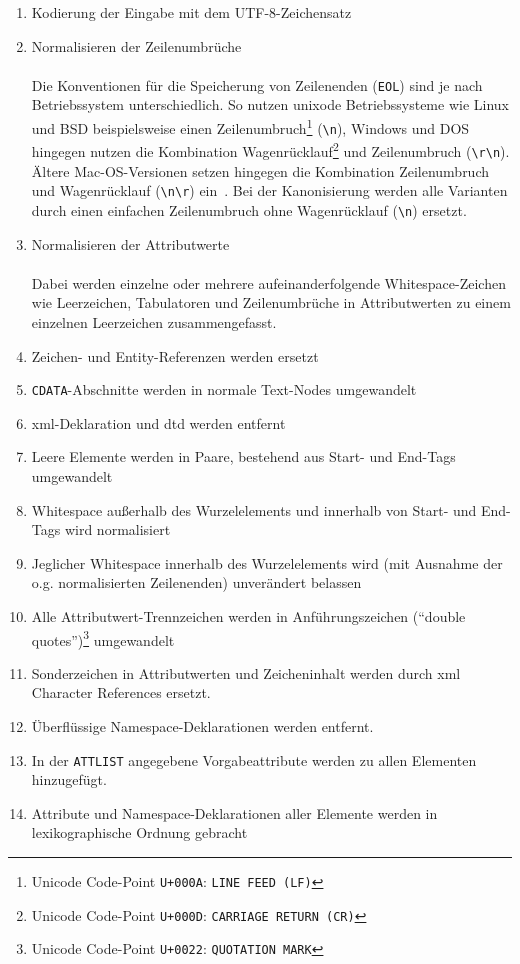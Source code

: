 \begin{enumerate}
    \item{} {Kodierung der Eingabe mit dem UTF-8-Zeichensatz}
    \item{} {Normalisieren der Zeilenumbrüche}\\\\
        Die Konventionen für die Speicherung von Zeilenenden (\texttt{EOL})
        sind je nach Betriebssystem unterschiedlich. So nutzen unixode
        Betriebssysteme wie Linux und BSD beispielsweise einen
        Zeilenumbruch\footnote{Unicode Code-Point \texttt{U+000A}:
        \texttt{LINE FEED (LF)}} (\texttt{{\textbackslash}n}), Windows und DOS hingegen
        nutzen die Kombination Wagenrücklauf\footnote{Unicode Code-Point
        \texttt{U+000D}: \texttt{CARRIAGE RETURN (CR)}} und Zeilenumbruch
        (\texttt{{\textbackslash}r{\textbackslash}n}). Ältere Mac-OS-Versionen setzen hingegen die
        Kombination Zeilenumbruch und Wagenrücklauf (\texttt{{\textbackslash}n{\textbackslash}r})
        ein~\cite[S.~212]{unicode9}.
        Bei der Kanonisierung werden alle Varianten durch einen einfachen
        Zeilenumbruch ohne Wagenrücklauf (\texttt{{\textbackslash}n}) ersetzt.
    \item{} {Normalisieren der Attributwerte}\\\\
        Dabei werden einzelne oder mehrere aufeinanderfolgende Whitespace-Zeichen wie Leerzeichen, Tabulatoren und Zeilenumbrüche in Attributwerten zu einem einzelnen Leerzeichen zusammengefasst.
    \item{} {Zeichen- und Entity-Referenzen werden ersetzt}
    \item{} \texttt{CDATA}-Abschnitte werden in normale Text-Nodes umgewandelt
    \item{} \acrshort{xml}-Deklaration und \gls{dtd} werden entfernt
    \item{} Leere Elemente werden in Paare, bestehend aus Start- und End-Tags umgewandelt
    \item{} Whitespace außerhalb des Wurzelelements und innerhalb von Start- und End-Tags wird normalisiert
    \item{} Jeglicher Whitespace innerhalb des Wurzelelements wird (mit Ausnahme der o.g. normalisierten Zeilenenden) unverändert belassen
    \item{} Alle Attributwert-Trennzeichen werden in Anführungszeichen (\enquote{double quotes})\footnote{Unicode Code-Point \texttt{U+0022}: \texttt{QUOTATION MARK}} umgewandelt
    \item{} Sonderzeichen in Attributwerten und Zeicheninhalt werden durch \acrshort{xml} Character References ersetzt.
    \item{} Überflüssige Namespace-Deklarationen werden entfernt.
    \item{} In der \texttt{ATTLIST} angegebene Vorgabeattribute werden zu allen Elementen hinzugefügt.
    \item{} Attribute und Namespace-Deklarationen aller Elemente werden in lexikographische Ordnung gebracht
\end{enumerate}

